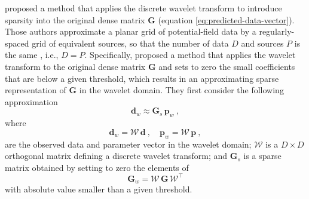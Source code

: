 \documentclass[utf8]{FrontiersinHarvard} %
\begin{document}
	\cite{li-oldenburg2010} proposed a method that applies the discrete wavelet transform to introduce sparsity into 
	the original dense matrix $\mathbf{G}$ (equation \ref{eq:predicted-data-vector}).
	Those authors approximate a planar grid of potential-field data by a regularly-spaced grid of equivalent sources,
	so that the number of data $D$ and sources $P$ is the same , i.e., $D = P$.
	Specifically, \cite{li-oldenburg2010} proposed a method that applies the wavelet transform to the original dense 
	matrix $\mathbf{G}$ and sets to zero the small coefficients that are below a given threshold, which results in an 
	approximating sparse representation of $\mathbf{G}$ in the wavelet domain.
	They first consider the following approximation
	\begin{equation}
		\mathbf{d}_{w} \approx \mathbf{G}_{s} \, \mathbf{p}_{w} \: ,
		\label{eq:approximated-linear-system-wavelet-domain}
	\end{equation}
	where 
	\begin{equation}
		\mathbf{d}_{w} = \boldsymbol{\mathcal{W}} \, \mathbf{d} \: , \quad 
		\mathbf{p}_{w} = \boldsymbol{\mathcal{W}} \, \mathbf{p} \: ,
		\label{eq:vectors-dw-pw}
	\end{equation}
	are the observed data and parameter vector in the wavelet domain; $\boldsymbol{\mathcal{W}}$ is a $D \times D$ orthogonal matrix defining a 
	discrete wavelet transform; and $\mathbf{G}_{s}$ is a sparse matrix obtained by setting to zero the elements of
	\begin{equation}
		\mathbf{G}_{w} = \boldsymbol{\mathcal{W}} \, \mathbf{G} \, \boldsymbol{\mathcal{W}}^{\top}
		\label{eq:matrix-Gw}
	\end{equation}
	with absolute value smaller than a given threshold.
	
\end{document}
